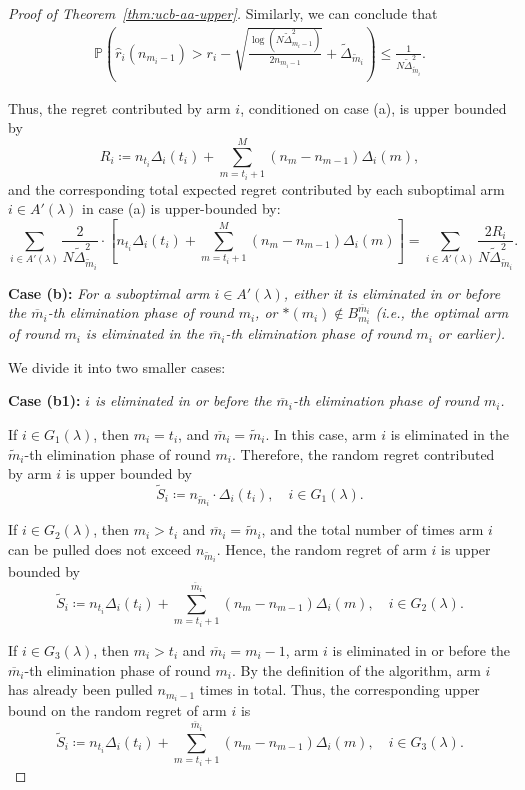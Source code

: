 \documentclass[
  12pt]{article}
\begin{document}
\begin{proof}[Proof of Theorem~\ref{thm:ucb-aa-upper}]
Similarly, we can conclude that
\begin{align}
    \mathbb{P}\left( \hat{r}_i(n_{m_i-1})>r_i - \sqrt{\frac{\log(N \tilde{\Delta}_{m_i-1}^2)}{2n_{m_i-1}}}+\tilde{\Delta}_{\tilde{m}_i} \right) 
   \leq \frac{1}{N\tilde{\Delta}_{\tilde{m}_i}^2}.
    \label{eq: optimal is bad A-3 G-3}
\end{align}

Thus, the regret contributed by arm $i$, conditioned on case (a), is upper bounded by
\[
R_i \coloneqq n_{t_i}\Delta_i(t_i) + \sum_{m = t_i + 1}^{M} (n_m - n_{m-1})\Delta_i(m),
\]
and the corresponding total expected regret contributed by each suboptimal arm $i\in A'(\lambda)$ in case (a) is upper-bounded by:
\[\sum_{i\in A'(\lambda)}\frac{2}{N \tilde{\Delta}_{\tilde{m}_i}^2}\cdot\left[n_{t_i}\Delta_i(t_i) + \sum_{m = t_i + 1}^{M} (n_m - n_{m-1})\Delta_i(m)\right]=\sum_{i\in A'(\lambda)}\frac{2R_i}{N\tilde{\Delta}_{\tilde{m}_i}^2}.\]

\textbf{Case (b):} \textit{For a suboptimal arm \( i \in A'(\lambda)\), either it is eliminated in or before the $\overline{m}_i$-th elimination phase of round $m_i$, or \( *(m_i) \notin B_{m_i}^{\overline{m}_i} \) (i.e., the optimal arm of round \( m_i \) is eliminated in the $\overline{m}_i$-th elimination phase of round $m_i$ or earlier).  }

We divide it into two smaller cases:

\textbf{Case (b1):}\textit{ $i$ is eliminated in or before the $\overline{m}_i$-th elimination phase of round $m_i$.  }

If $i\in G_1(\lambda)$, then $m_i=t_i$, and $\overline{m}_i=\tilde{m}_i$. In this case, arm $i$ is eliminated in the $\tilde{m}_i$-th elimination phase of round $m_i$. Therefore, the random regret contributed by arm $i$ is upper bounded by
\[\tilde{S}_i\coloneqq n_{\tilde{m}_i}\cdot \Delta_i(t_i),\quad i\in G_1(\lambda).\]

If $i\in G_2(\lambda)$, then $m_i>t_i$ and $\overline{m}_i=\tilde{m}_i$, and the total number of times arm \( i \) can be pulled does not exceed $n_{\tilde{m}_i}$. Hence, the random regret of arm $i$ is upper bounded by
\[\tilde{S}_i\coloneqq n_{t_i}\Delta_i(t_i) + \sum_{m = t_i + 1}^{\overline{m}_i} (n_m - n_{m-1})\Delta_i(m), \quad i\in G_2(\lambda).\]

If $i\in G_3(\lambda)$, then $m_i>t_i$ and $\overline{m}_i=m_i-1$, arm $i$ is eliminated in or before the $\overline{m}_i$-th elimination phase of round $m_i$. By the definition of the algorithm, arm $i$ has already been pulled $n_{m_i-1}$ times in total. Thus, the corresponding upper bound on the random regret of arm $i$ is
\[\tilde{S}_i\coloneqq n_{t_i}\Delta_i(t_i)+\sum_{m=t_i+1}^{\overline{m}_i}(n_m-n_{m-1})\Delta_i(m),\quad i\in G_3(\lambda).\]


\end{proof}
\end{document}
